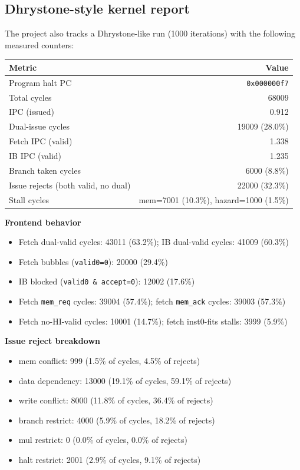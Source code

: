 \documentclass[11pt]{article}
\begin{document}
\subsection{Dhrystone-style kernel report}
The project also tracks a Dhrystone-like run (1000 iterations) with the following measured counters:
\begin{center}
\begin{tabular}{@{}l r@{}}
\toprule
Metric & Value \\
\midrule
Program halt PC & \texttt{0x000000f7} \\
Total cycles & 68009 \\
IPC (issued) & 0.912 \\
Dual-issue cycles & 19009 (28.0\%) \\
Fetch IPC (valid) & 1.338 \\
IB IPC (valid) & 1.235 \\
Branch taken cycles & 6000 (8.8\%) \\
Issue rejects (both valid, no dual) & 22000 (32.3\%) \\
Stall cycles & mem=7001 (10.3\%), hazard=1000 (1.5\%) \\
\bottomrule
\end{tabular}
\end{center}

\textbf{Frontend behavior}
\begin{itemize}[leftmargin=*]
  \item Fetch dual-valid cycles: 43011 (63.2\%); IB dual-valid cycles: 41009 (60.3\%)
  \item Fetch bubbles (\texttt{valid0=0}): 20000 (29.4\%)
  \item IB blocked (\texttt{valid0 \& accept=0}): 12002 (17.6\%)
  \item Fetch \texttt{mem\_req} cycles: 39004 (57.4\%); fetch \texttt{mem\_ack} cycles: 39003 (57.3\%)
  \item Fetch no-HI-valid cycles: 10001 (14.7\%); fetch inst0-fits stalls: 3999 (5.9\%)
\end{itemize}

\textbf{Issue reject breakdown}
\begin{itemize}[leftmargin=*]
  \item mem conflict: 999 (1.5\% of cycles, 4.5\% of rejects)
  \item data dependency: 13000 (19.1\% of cycles, 59.1\% of rejects)
  \item write conflict: 8000 (11.8\% of cycles, 36.4\% of rejects)
  \item branch restrict: 4000 (5.9\% of cycles, 18.2\% of rejects)
  \item mul restrict: 0 (0.0\% of cycles, 0.0\% of rejects)
  \item halt restrict: 2001 (2.9\% of cycles, 9.1\% of rejects)
\end{itemize}
\end{document}
